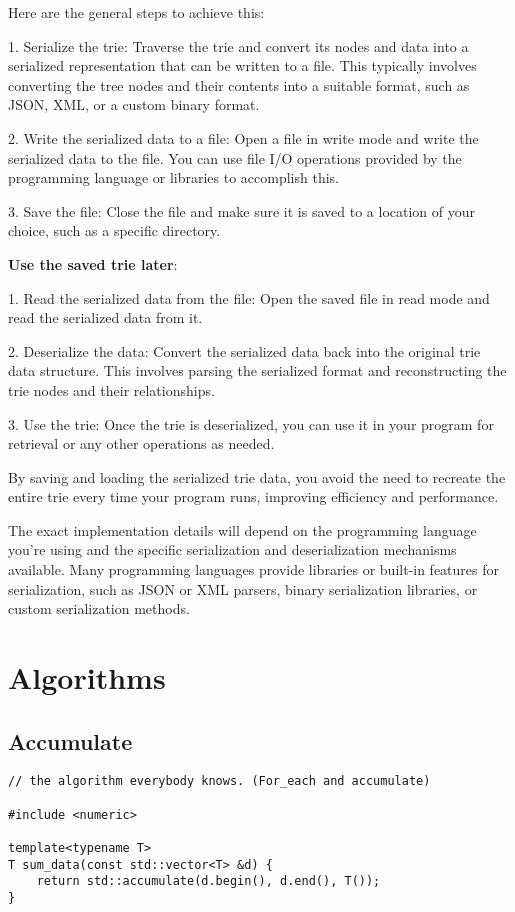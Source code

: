 Here are the general steps to achieve this:

1. Serialize the trie: Traverse the trie and convert its nodes and data
into a serialized representation that can be written to a file.
This typically involves converting the tree nodes and their contents into
a suitable format, such as JSON, XML, or a custom binary format.

2. Write the serialized data to a file: Open a file in write mode and write the serialized data to the file.
You can use file I/O operations provided by the programming language or libraries to accomplish this.

3. Save the file: Close the file and make sure it is saved to a location of your choice,
such as a specific directory.

\textbf{Use the saved trie later}:

1. Read the serialized data from the file:
Open the saved file in read mode and read the serialized data from it.

2. Deserialize the data: Convert the serialized data back into the original trie data structure.
This involves parsing the serialized format and reconstructing the trie nodes and their relationships.

3. Use the trie: Once the trie is deserialized,
you can use it in your program for retrieval or any other operations as needed.

By saving and loading the serialized trie data,
you avoid the need to recreate the entire trie every time your program runs,
improving efficiency and performance.

The exact implementation details will depend on the programming language 
you're using and the specific serialization and deserialization mechanisms available.
Many programming languages provide libraries or built-in features for serialization,
such as JSON or XML parsers, binary serialization libraries, or custom serialization methods.

\section{Algorithms}

\subsection{Accumulate}

\begin{verbatim}
// the algorithm everybody knows. (For_each and accumulate)

#include <numeric>

template<typename T>
T sum_data(const std::vector<T> &d) {
    return std::accumulate(d.begin(), d.end(), T());
}
\end{verbatim}

